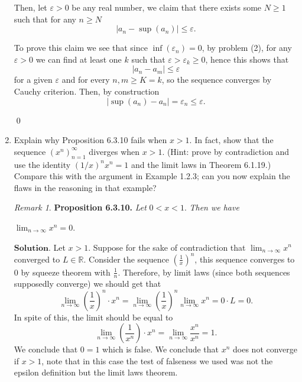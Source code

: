 \documentclass{article}
\theoremstyle{remark}
\newtheorem*{remark}{Remark}
\begin{document}
\begin{enumerate}
        Then, let $\varepsilon > 0$ be any real number, we claim that there exists some $N \geq 1$ such that for any $n \geq N$
        \[
        \vert a_n - \sup(a_n) \vert \leq \varepsilon.
        \]

        To prove this claim we see that since $\inf(\varepsilon_n) = 0$, by problem (2), for any $\varepsilon > 0$ we can find at least one $k$ such that $\varepsilon > \varepsilon_k \geq 0$,
        hence this shows that
        \[
        \vert a_n - a_m \vert \leq \varepsilon
        \]
        for a given $\varepsilon$ and for every $n,m \geq K = k$, so the sequence converges by Cauchy criterion.
        Then, by construction
        \[
        \vert \sup(a_n) - a_n \vert = \varepsilon_n \leq \varepsilon.
        \]
        \begin{flushright}
            \qed
        \end{flushright}

        \item Explain why Proposition 6.3.10 fails when \( x > 1 \). 
        In fact, show that the sequence \((x^n)_{n=1}^\infty\) diverges when \( x > 1 \). 
        (Hint: prove by contradiction and use the identity \((1/x)^n x^n = 1\) and the limit laws in Theorem 6.1.19.) 
        Compare this with the argument in Example 1.2.3; can you now explain the flaws in the reasoning in that example?
        \begin{remark}
            \textbf{Proposition 6.3.10.} \textit{Let } $0 < x < 1$. \textit{Then we have } 
            
            $\lim_{n\to\infty}x^n = 0$.
        \end{remark}
        $\textbf{Solution.}$ Let $x > 1$.
        Suppose for the sake of contradiction that $\lim_{n\to\infty}x^n$ converged to $L \in \mathbb{R}$.
        Consider the sequence $\left(\frac{1}{x}\right)^n$, this sequence converges to $0$ by squeeze theorem with $\frac{1}{n}$.
        Therefore, by limit laws (since both sequences supposedly converge) we should get that 
        \[
        \lim_{n\to\infty}\left(\frac{1}{x}\right)^n\cdot x^n = \lim_{n\to\infty} \left(\frac{1}{x}\right)^n\lim_{n\to\infty}x^n = 0\cdot L = 0.
        \]
        In spite of this, the limit should be equal to 
        \[
        \lim_{n\to\infty}\left(\frac{1}{x^n}\right)\cdot x^n = \lim_{n\to\infty}\frac{x^n}{x^n} = 1.
        \]
        We conclude that $0=1$ which is false. We conclude that $x^n$ does not converge if $x > 1$, note that in this case the test 
        of falseness we used was not the epsilon definition but the limit laws theorem.


\end{enumerate}
\end{document}
